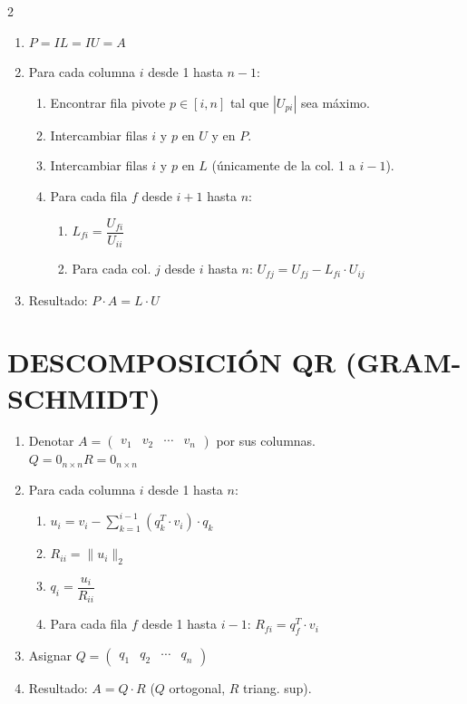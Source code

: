 \documentclass[10pt]{extarticle}
\newenvironment{term}
  {\begin{minipage}{\linewidth}}
  {\end{minipage}\par}
\begin{document}
\begin{multicols}{2}
\begin{term}
\begin{enumerate}
\item $P=I$\quad $L=I$\quad $U=A$
\item Para cada columna $i$ desde 1 hasta $n-1$:
\begin{enumerate}
\item Encontrar fila pivote $p \in [i,n]$ tal que $|U_{pi}|$ sea máximo.
\item Intercambiar filas $i$ y $p$ en $U$ y en $P$.
\item Intercambiar filas $i$ y $p$ en $L$ (únicamente de la col. 1 a $i-1$).
\item Para cada fila $f$ desde $i+1$ hasta $n$:
\begin{enumerate}
\item $L_{fi} = \dfrac{U_{fi}}{U_{ii}}$
\item Para cada col. $j$ desde $i$ hasta $n$: $U_{fj} = U_{fj} - L_{fi}\cdot U_{ij}$
\end{enumerate}
\end{enumerate}
\item Resultado: $P\cdot A = L\cdot U$
\end{enumerate}
\end{term}

\begin{term}
\section*{DESCOMPOSICIÓN QR (GRAM-SCHMIDT)}
\begin{enumerate}
\item Denotar $A = \begin{pmatrix}v_1 & v_2 & \cdots & v_n\end{pmatrix}$ por sus columnas. \\ $Q = 0_{n\times n}$\quad $R = 0_{n\times n}$
\item Para cada columna $i$ desde 1 hasta $n$:
\begin{enumerate}
\item $u_i = v_i - \sum_{k=1}^{i-1}(q_k^T\cdot v_i)\cdot q_k$
\item $R_{ii} = \|u_i\|_2$
\item $q_i = \dfrac{u_i}{R_{ii}}$
\item Para cada fila $f$ desde 1 hasta $i-1$: $R_{fi} = q_f^T\cdot v_i$
\end{enumerate}
\item Asignar $Q = \begin{pmatrix}q_1 & q_2 & \cdots & q_n\end{pmatrix}$
\item Resultado: $A = Q\cdot R$ ($Q$ ortogonal, $R$ triang. sup).
\end{enumerate}
\end{term}




\end{multicols}
\end{document}
